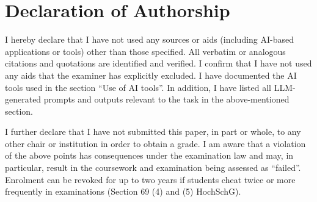 \onehalfspacing
\section*{Declaration of Authorship}
\vspace{1cm}

\raggedright
\justifying
\noindent
I hereby declare that I have not used any sources or aids (including AI-based applications or tools) other than those specified.
All verbatim or analogous citations and quotations are identified and verified. I confirm that I have not used any aids that the
examiner has explicitly excluded. I have documented the AI tools used in the section “Use of AI tools”. In addition, I have listed
all LLM-generated prompts and outputs relevant to the task in the above-mentioned section. 
\vspace{0.5cm}

\noindent
I further declare that I have not submitted this paper, in part or whole, to any other chair or institution in order to obtain a grade.
I am aware that a violation of the above points has consequences under the examination law and may, in particular, result in the coursework
and examination being assessed as “failed”. Enrolment can be revoked for up to two years if students cheat twice or more frequently in 
examinations (Section 69 (4) and (5) HochSchG). 


\vspace{1.5cm}

\begin{flushright}
    \makebox[0.5\textwidth]{\hrulefill} \\ %
     \\ %
     \\
\end{flushright}
